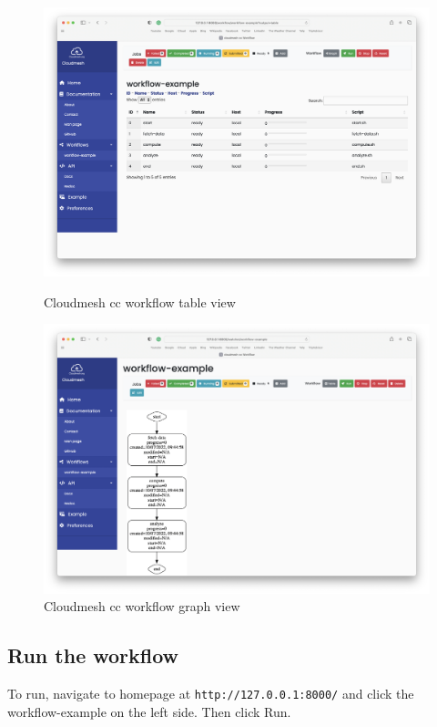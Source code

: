 \begin{figure}[htb]
{\centering
\includegraphics[width=1.05\columnwidth]{images/service-table.png}}
\caption{Cloudmesh cc workflow table view}\label{fig:table}

{\includegraphics[width=1.05\columnwidth]{images/service-graph.png}
  \caption{Cloudmesh cc workflow graph view}}
\label{fig:graph}
\end{figure}



\subsection{Run the workflow}\label{run-the-workflow}

To run, navigate to homepage at \texttt{http://127.0.0.1:8000/} and
click the workflow-example on the left side. Then click Run.





